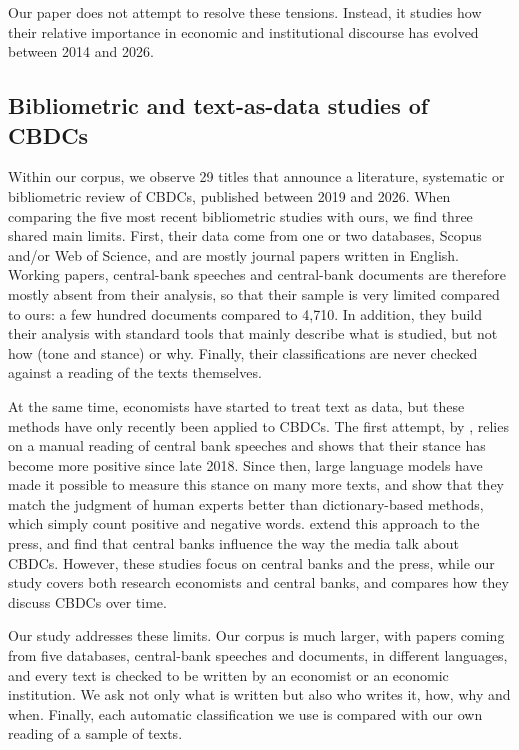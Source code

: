 \documentclass[11pt,a4paper]{article}
\begin{document}
Our paper does not attempt to resolve these tensions. Instead, it studies how their relative importance in economic and 
institutional discourse has evolved between 2014 and 2026.

\subsection{Bibliometric and text-as-data studies of CBDCs}

Within our corpus, we observe 29 titles that announce a literature,
systematic or bibliometric review of CBDCs, published between 2019 and
2026. When comparing the five most recent bibliometric studies 
\parencite{kvedaraviciute2024,fahad2024,bapat2025,prodan2024,paulovici2026} with ours, 
we find three shared main limits. First, their
data come from one or two databases, Scopus and/or Web of Science, and are
mostly journal papers written in English. Working papers, central-bank speeches 
and central-bank documents are therefore mostly absent from their analysis, 
so that their sample is very limited compared to ours: a few hundred documents 
compared to 4,710. In addition, they build their analysis with standard tools that mainly
describe what is studied, but not how (tone and stance) or why. Finally,
their classifications are never checked against a reading of the texts
themselves.

At the same time, economists have started to treat text as data, but these methods have 
only recently been applied to CBDCs. The first attempt, by \textcite{auer2020}, relies 
on a manual reading of central bank speeches and shows that their stance has become more 
positive since late 2018. Since then, large language models have made it possible to measure 
this stance on many more texts, and \textcite{alonso2023} show that they match the judgment 
of human experts better than dictionary-based methods, which simply count positive and negative 
words. \textcite{hofmann2025} extend this approach to the press, and find that central banks 
influence the way the media talk about CBDCs. However, these studies focus on central banks 
and the press, while our study covers both research economists and central banks, and compares 
how they discuss CBDCs over time.

Our study addresses these limits. Our corpus is much larger, with
papers coming from five databases, central-bank speeches and documents, in
different languages, and every text is checked to be written by an
economist or an economic institution. We ask not only what is written but
also who writes it, how, why and when. Finally, each automatic
classification we use is compared with our own reading of a sample of
texts.
\end{document}
